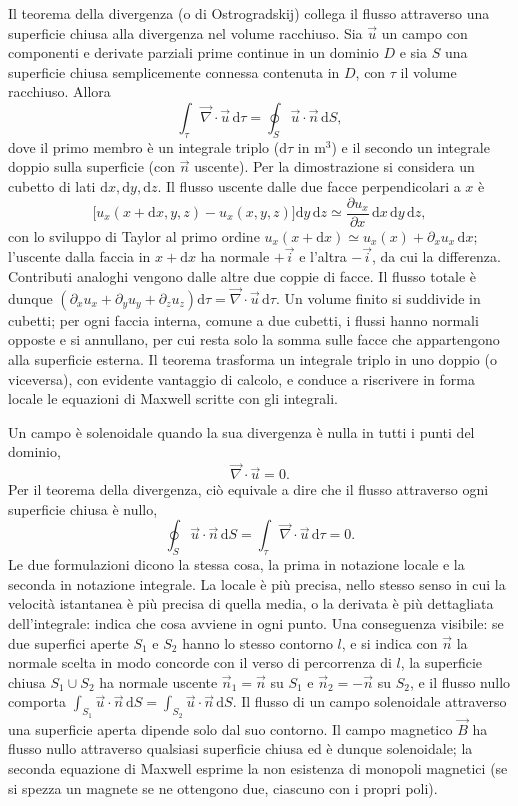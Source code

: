 \documentclass[11pt,a4paper]{article}
\newcommand{\nab}{\vec{\nabla}}
\newcommand{\dd}{\mathrm{d}}
\begin{document}
Il teorema della divergenza (o di Ostrogradskij) collega il flusso attraverso una superficie chiusa alla divergenza nel volume racchiuso. Sia $\vec u$ un campo con componenti e derivate parziali prime continue in un dominio $D$ e sia $S$ una superficie chiusa semplicemente connessa contenuta in $D$, con $\tau$ il volume racchiuso. Allora
\[
\int_\tau\nab\cdot\vec u\,\dd\tau=\oint_S\vec u\cdot\vec n\,\dd S ,
\]
dove il primo membro è un integrale triplo ($\dd\tau$ in $\mathrm{m^3}$) e il secondo un integrale doppio sulla superficie (con $\vec n$ uscente). Per la dimostrazione si considera un cubetto di lati $\dd x,\dd y,\dd z$. Il flusso uscente dalle due facce perpendicolari a $x$ è
\[
\bigl[u_x(x+\dd x,y,z)-u_x(x,y,z)\bigr]\dd y\,\dd z\simeq\frac{\partial u_x}{\partial x}\,\dd x\,\dd y\,\dd z ,
\]
con lo sviluppo di Taylor al primo ordine $u_x(x+\dd x)\simeq u_x(x)+\partial_xu_x\,\dd x$; l'uscente dalla faccia in $x+\dd x$ ha normale $+\vec i$ e l'altra $-\vec i$, da cui la differenza. Contributi analoghi vengono dalle altre due coppie di facce. Il flusso totale è dunque $\left(\partial_xu_x+\partial_yu_y+\partial_zu_z\right)\dd\tau=\nab\cdot\vec u\,\dd\tau$. Un volume finito si suddivide in cubetti; per ogni faccia interna, comune a due cubetti, i flussi hanno normali opposte e si annullano, per cui resta solo la somma sulle facce che appartengono alla superficie esterna. Il teorema trasforma un integrale triplo in uno doppio (o viceversa), con evidente vantaggio di calcolo, e conduce a riscrivere in forma locale le equazioni di Maxwell scritte con gli integrali.



Un campo è solenoidale quando la sua divergenza è nulla in tutti i punti del dominio,
\[
\nab\cdot\vec u=0 .
\]
Per il teorema della divergenza, ciò equivale a dire che il flusso attraverso ogni superficie chiusa è nullo,
\[
\oint_S\vec u\cdot\vec n\,\dd S=\int_\tau\nab\cdot\vec u\,\dd\tau=0 .
\]
Le due formulazioni dicono la stessa cosa, la prima in notazione locale e la seconda in notazione integrale. La locale è più precisa, nello stesso senso in cui la velocità istantanea è più precisa di quella media, o la derivata è più dettagliata dell'integrale: indica che cosa avviene in ogni punto. Una conseguenza visibile: se due superfici aperte $S_1$ e $S_2$ hanno lo stesso contorno $l$, e si indica con $\vec n$ la normale scelta in modo concorde con il verso di percorrenza di $l$, la superficie chiusa $S_1\cup S_2$ ha normale uscente $\vec n_1=\vec n$ su $S_1$ e $\vec n_2=-\vec n$ su $S_2$, e il flusso nullo comporta $\int_{S_1}\vec u\cdot\vec n\,\dd S=\int_{S_2}\vec u\cdot\vec n\,\dd S$. Il flusso di un campo solenoidale attraverso una superficie aperta dipende solo dal suo contorno. Il campo magnetico $\vec B$ ha flusso nullo attraverso qualsiasi superficie chiusa ed è dunque solenoidale; la seconda equazione di Maxwell esprime la non esistenza di monopoli magnetici (se si spezza un magnete se ne ottengono due, ciascuno con i propri poli).
\end{document}
